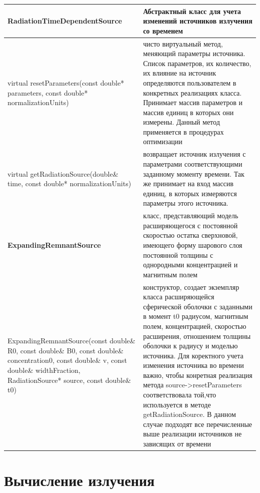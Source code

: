\begin{small}
	\label{sourceTimeDependentMethods1}
	\begin{xtabular}{|p{0.5\textwidth}|p{0.5\textwidth}|}
		\hline
		\textbf{RadiationTimeDependentSource} & Абстрактный класс для учета изменений источников излучения со временем\\
		\hline
		virtual resetParameters(const double* parameters, const double* normalizationUnits) & чисто виртуальный метод, меняющий параметры источника. Список параметров, их количество, их влияние на источник определяются пользователем в конкретных реализациях класса. Принимает массив параметров и массив единиц в которых они измерены. Данный метод применяется в процедурах оптимизации\\
		\hline
		virtual getRadiationSource(double\& time, const double* normalizationUnits) & возвращает источник излучения с параметрами соответствующими заданному моменту времени. Так же принимает на вход массив единиц, в которых измеряются параметры этого источника.\\
		\hline
		\textbf{ExpandingRemnantSource} & класс, представляющий модель расширяющегося с постоянной скоростью остатка сверхновой, имеющего форму шарового слоя постоянной толщины с однородными концентрацией и магнитным полем \\
		\hline
		ExpandingRemnantSource(const double\& R0, const double\& B0, const double\& concentration0, const double\& v, const double\& widthFraction, RadiationSource* source, const double\& t0) & конструктор, создает экземпляр класса расширяющейся сферической оболочки с заданными в момент t0 радиусом, магнитным полем, концентрацией, скоростью расширения, отношением толщины оболочки к радиусу и моделью источника. Для коректного учета изменения источника во времени важно, чтобы конретная реализация метода source->resetParameters соответствовала той,что используется в методе getRadiationSource. В данном случае подходят все перечисленные выше реализации источников не зависящих от времени\\
		\hline
	\end{xtabular}
\end{small}

\section{Вычисление излучения}

